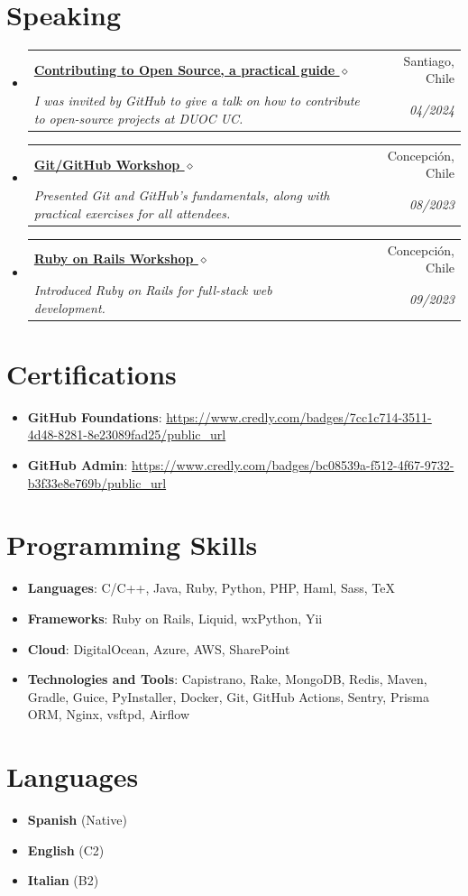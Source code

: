 \documentclass[letterpaper,11pt]{article}
\makeatletter
\newcommand{\resumeSubheading}[4]{
	\vspace{-1pt}\item
	\begin{tabular*}{0.97\textwidth}[t]{l@{\extracolsep{\fill}}r}
		\textbf{#1} & #2 \\
		\textit{\small#3} & \textit{\small #4} \\
	\end{tabular*}\vspace{-5pt}
}
\newcommand{\resumeSubHeadingListStart}{\begin{itemize}[leftmargin=*]}
\newcommand{\resumeSubHeadingListEnd}{\end{itemize}}
\makeatother
\begin{document}
	\section{Speaking}
	\resumeSubHeadingListStart
	\resumeSubheading
	{\href{https://youtu.be/S_qkjY7k_L8?t=2698}{Contributing to Open Source, a practical guide $\diamond$}}{Santiago, Chile}
	{I was invited by GitHub to give a talk on how to contribute to open-source projects at DUOC UC.}{04/2024}
	\resumeSubheading
	{\href{https://bgm.dev/about}{Git/GitHub Workshop $\diamond$}}{Concepción, Chile}
	{Presented Git and GitHub’s fundamentals, along with practical exercises for all attendees.}{08/2023}
	\resumeSubheading
	{\href{https://bgm.dev/about}{Ruby on Rails Workshop $\diamond$}}{Concepción, Chile}
	{Introduced Ruby on Rails for full-stack web development.}{09/2023}
	\resumeSubHeadingListEnd
	
	\section{Certifications}
	\resumeSubHeadingListStart
	\item{
		\textbf{GitHub Foundations}{: \url{https://www.credly.com/badges/7cc1c714-3511-4d48-8281-8e23089fad25/public_url}}
	}
  \item{
    \textbf{GitHub Admin}{: \url{https://www.credly.com/badges/bc08539a-f512-4f67-9732-b3f33e8e769b/public_url}}
  }
	\resumeSubHeadingListEnd
	
	\section{Programming Skills}
	\resumeSubHeadingListStart
	\item{
		\textbf{Languages}{: C/C++, Java, Ruby, Python, PHP, Haml, Sass, TeX}
	}
	\item{
		\textbf{Frameworks}{: Ruby on Rails, Liquid, wxPython, Yii}
	}
	\item{
		\textbf{Cloud}{: DigitalOcean, Azure, AWS, SharePoint}
	}
	\item{
		\textbf{Technologies and Tools}{: Capistrano, Rake, MongoDB, Redis, Maven, Gradle, Guice, PyInstaller, Docker, Git, GitHub Actions, Sentry, Prisma ORM, Nginx, vsftpd, Airflow}
	}
	\resumeSubHeadingListEnd
	
	\section{Languages}
	\resumeSubHeadingListStart
	\item{
		\textbf{Spanish}{ (Native)}
	}
	\item{
		\textbf{English}{ (C2)}
	}
	\item{
		\textbf{Italian}{ (B2)}
	}
	\resumeSubHeadingListEnd
	
\end{document}

